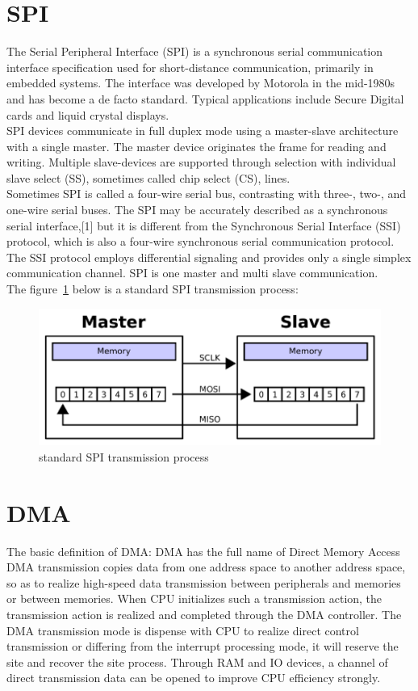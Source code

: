 \section{SPI}
\label{sec:SPI}
The Serial Peripheral Interface (SPI) is a synchronous serial communication interface specification used for short-distance communication, primarily in embedded systems. The interface was developed by Motorola in the mid-1980s and has become a de facto standard. Typical applications include Secure Digital cards and liquid crystal displays.
\\
SPI devices communicate in full duplex mode using a master-slave architecture with a single master. The master device originates the frame for reading and writing. Multiple slave-devices are supported through selection with individual slave select (SS), sometimes called chip select (CS), lines.
\\
Sometimes SPI is called a four-wire serial bus, contrasting with three-, two-, and one-wire serial buses. The SPI may be accurately described as a synchronous serial interface,[1] but it is different from the Synchronous Serial Interface (SSI) protocol, which is also a four-wire synchronous serial communication protocol. The SSI protocol employs differential signaling and provides only a single simplex communication channel. SPI is one master and multi slave communication.
\\
The figure~\ref{fig:2.12}  below is a standard SPI transmission process:
\begin{figure}[!ht]
	\centering
	\includegraphics[width=15cm]{grafiken/2.12.pdf}
	\caption{standard SPI transmission process} 
	\label{fig:2.12}
\end{figure}
\FloatBarrier

\section{DMA}
\label{sec:DMA}
The basic definition of DMA: 
DMA has the full name of Direct Memory Access 
DMA transmission copies data from one address space to another address space, so as to realize high-speed data transmission between peripherals and memories or between memories. When CPU initializes such a transmission action, the transmission action is realized and completed through the DMA controller. The DMA transmission mode is dispense with CPU to realize direct control transmission or differing from the interrupt processing mode, it will reserve the site and recover the site process. Through RAM and IO devices, a channel of direct transmission data can be opened to improve CPU efficiency strongly. 

